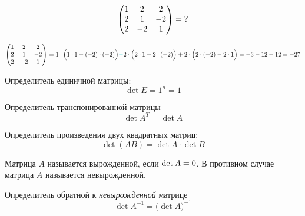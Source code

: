 \documentclass[a4paper,12pt]{article}
\begin{document}
  \begin{problem}[14.7(3)]
    \[
      \begin{pmatrix}
        1 & 2 & 2\\
        2 & 1 & -2\\
        2 & -2 & 1
      \end{pmatrix} = \operatorname{?}
    \]
  \end{problem}
  
  \begin{solution}
    \[
      \begin{pmatrix}
        1 & 2 & 2\\
        2 & 1 & -2\\
        2 & -2 & 1
      \end{pmatrix}
      = 1 \cdot \Bigl(1 \cdot 1 - (-2) \cdot (-2)\Bigr)
        \textcolor{light-cyan}{-} 2 \cdot \Bigl(2 \cdot 1 - 2 \cdot (-2)\Bigr)
        + 2 \cdot \Bigl(2 \cdot (-2) - 2 \cdot 1\Bigr)
      = -3 - 12 - 12
      = -27
    \]
  \end{solution}
  
  \begin{example}
    Определитель единичной матрицы:
    \[
      \det E = 1^n = 1
    \]
  \end{example}

  \begin{theorem}
    Определитель транспонированной матрицы
    \[
      \det A^T = \det A
    \]
  \end{theorem}
  
  \begin{theorem}
    Определитель произведения двух квадратных матриц:
    \[
      \det (AB) = \det A \cdot \det B
    \]
  \end{theorem}
  
  \begin{definition}[Вырожденная матрица\footnote{Определение вырожденной матрицы можно вводить по-разному. Ещё возможный вариант: квадратная матрица называется вырожденной, если её строки $\{\bds a_i\}_{i=1}^n$ линейно зависимы. Строки линейно зависимы~---~когда существует нетривиальная линейная комбинация строк, которая даёт нулевую строку: $\sum_{i=1}^n \alpha_i \bds a_i \hm= \bds 0$, $\sum_{i=1}^n \alpha_i^2 \hm > 0$.}]
    Матрица $A$ называется вырожденной, если $\det A \hm= 0$.
    В противном случае матрица $A$ называется невырожденной.
  \end{definition}
  
  \begin{theorem}
    Определитель обратной к \emph{невырожденной} матрице
    \[
      \det A^{-1} = \bigl(\det A\bigl)^{-1}
    \]
  \end{theorem}
  
\end{document}
